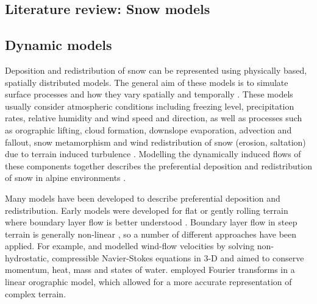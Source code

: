 \documentclass{sfuthesis}
\begin{document}
%
%
%
%
%

\backmatter%
	
	

\begin{appendices} 

\chapter{Literature review: Snow models }
\label{app:snow_models}

\section{Dynamic models}

Deposition and redistribution of snow can be represented using physically based, spatially distributed models. The general aim of these models is to simulate surface processes and how they vary spatially and temporally \citep{Mott2008}. These models usually consider atmospheric conditions including freezing level, precipitation rates, relative humidity and wind speed and direction, as well as processes such as orographic lifting, cloud formation, downslope evaporation, advection and fallout, snow metamorphism and wind redistribution of snow (erosion, saltation) due to terrain induced turbulence \citep{Smith2004, Liston2006, Lehning2008, Mott2008}.  Modelling the dynamically induced flows of these components together describes the preferential deposition and redistribution of snow in alpine environments \citep{Lehning2008,Mott2008,Dadic2010}.

Many models have been developed to describe preferential deposition and redistribution. Early models were developed for flat or gently rolling terrain where boundary layer flow is better understood \citep{Dadic2010}. Boundary layer flow in steep terrain is generally non-linear \citep{Mott2008, Dadic2010}, so a number of different approaches have been applied.  For example, \cite{Dadic2010} and \citep{Lehning2008}modelled wind-flow velocities by solving non-hydrostatic, compressible Navier-Stokes equations in 3-D and aimed to conserve momentum, heat, mass and states of water. \cite{Smith2004} employed Fourier transforms in a linear orographic model, which allowed for a more accurate representation of complex terrain. 


\end{appendices}
\end{document}
